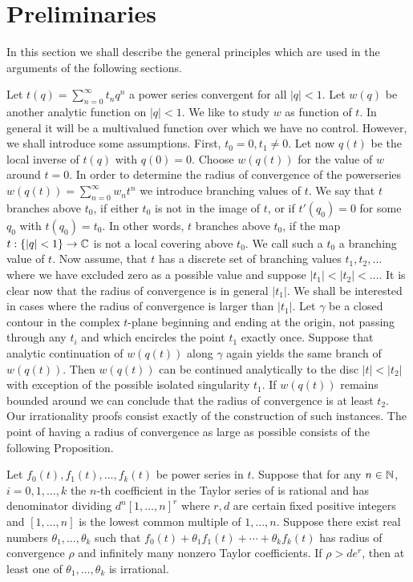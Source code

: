\section{Preliminaries}

In this section we shall describe the general principles which are used in the arguments of the following sections.

Let $t(q) = \sum_{n=0}^{\infty} t_n q^n$ a power series convergent for all $|q| < 1$.
Let $w(q)$ be another analytic function on $|q| < 1$.
We like to study $w$ as function of $t$.
In general it will be a multivalued function over which we have no control.
However, we shall introduce some assumptions.
First, $t_0 = 0, t_1 \ne 0$.
Let now $q(t)$ be the local inverse of $t(q)$ with $q(0) = 0$.
Choose $w(q(t))$ for the value of $w$ around $t = 0$.
In order to determine the radius of convergence of the powerseries $w(q(t)) = \sum_{n=0}^{\infty} w_n t^n$ we introduce branching values of $t$.
We say that $t$ branches above $t_0$, if either $t_0$ is not in the image of $t$, or if $t'(q_0) = 0$ for some $q_0$ with $t(q_0) = t_0$.
In other words, $t$ branches above $t_0$, if the map $t : \{|q| < 1\} \to \mathbb{C}$ is not a local covering above $t_0$.
We call such a $t_0$ a branching value of $t$.
Now assume, that $t$ has a discrete set of branching values $t_1, t_2, \dots$ where we have excluded zero as a possible value and suppose $|t_1| < |t_2| < \dots$.
It is clear now that the radius of convergence is in general $|t_1|$.
We shall be interested in cases where the radius of convergence is larger than $|t_1|$.
Let $\gamma$ be a closed contour in the complex $t$-plane beginning and ending at the origin, not passing through any $t_i$ and which encircles the point $t_1$ exactly once.
Suppose that analytic continuation of $w(q(t))$ along $\gamma$ again yields the same branch of $w(q(t))$.
Then $w(q(t))$ can be continued analytically to the disc $|t| < |t_2|$ with exception of the possible isolated singularity $t_1$.
If $w(q(t))$ remains bounded around we can conclude that the radius of convergence is at least $t_2$.
Our irrationality proofs consist exactly of the construction of such instances.
The point of having a radius of convergence as large as possible consists of the following Proposition.

\begin{proposition}
    \label{prop:1.1}
    Let $f_0(t), f_1(t), \dots, f_k(t)$ be power series in $t$.
    Suppose that for any $n \in \mathbb{N}$, $i = 0, 1, \dots, k$ the $n$-th coefficient in the Taylor series of is rational and has denominator dividing $d^n [1, \dots, n]^r$
     where $r, d$ are certain fixed positive integers and $[1, \dots, n]$ is the lowest common multiple of $1, \dots, n$.
    Suppose there exist real numbers $\theta_1, \dots, \theta_k$ such that $f_0(t) + \theta_1 f_1(t) + \cdots + \theta_k f_k(t)$ has radius of convergence $\rho$ and infinitely many nonzero Taylor coefficients.
    If $\rho > d e^r$, then at least one of $\theta_1, \dots, \theta_k$ is irrational.
\end{proposition}

